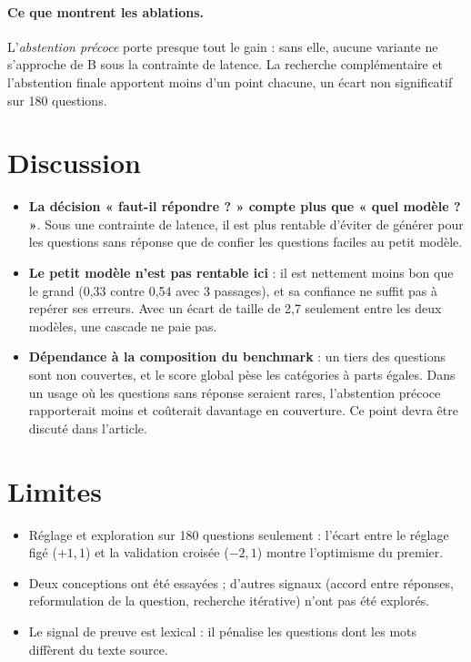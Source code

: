 \documentclass[11pt,a4paper]{article}
\begin{document}
\paragraph{Ce que montrent les ablations.} L'\emph{abstention précoce} porte presque tout le gain : sans
elle, aucune variante ne s'approche de B sous la contrainte de latence. La recherche complémentaire et
l'abstention finale apportent moins d'un point chacune, un écart non significatif sur 180 questions.

\section{Discussion}\label{sec:discussion}

\begin{itemize}
\item \textbf{La décision « faut-il répondre ? » compte plus que « quel modèle ? »}. Sous une contrainte de
latence, il est plus rentable d'éviter de générer pour les questions sans réponse que de confier les
questions faciles au petit modèle.
\item \textbf{Le petit modèle n'est pas rentable ici} : il est nettement moins bon que le grand (0,33
contre 0,54 avec 3 passages), et sa confiance ne suffit pas à repérer ses erreurs. Avec un écart de
taille de 2,7 seulement entre les deux modèles, une cascade ne paie pas.
\item \textbf{Dépendance à la composition du benchmark} : un tiers des questions sont non couvertes, et le
score global pèse les catégories à parts égales. Dans un usage où les questions sans réponse seraient
rares, l'abstention précoce rapporterait moins et coûterait davantage en couverture. Ce point devra être
discuté dans l'article.
\end{itemize}

\section{Limites}\label{sec:limites}

\begin{itemize}
\item Réglage et exploration sur 180 questions seulement : l'écart entre le réglage figé ($+1{,}1$) et la
validation croisée ($-2{,}1$) montre l'optimisme du premier.
\item Deux conceptions ont été essayées ; d'autres signaux (accord entre réponses, reformulation de la
question, recherche itérative) n'ont pas été explorés.
\item Le signal de preuve est lexical : il pénalise les questions dont les mots diffèrent du texte source.
\end{itemize}
\end{document}
